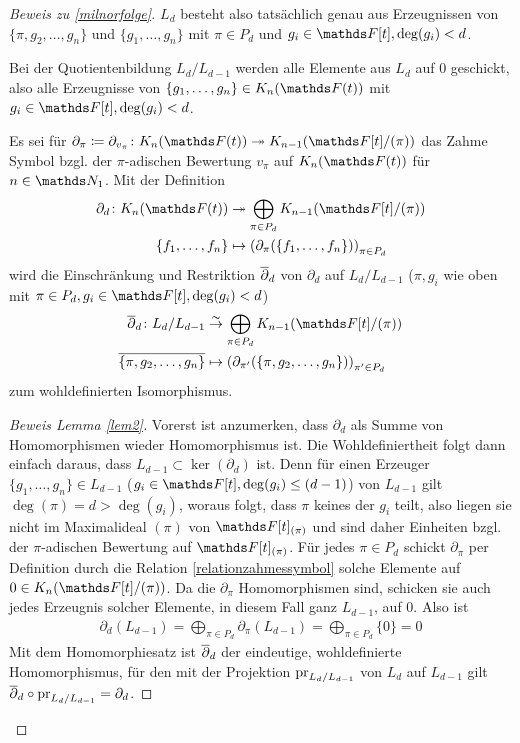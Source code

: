 \documentclass[ngerman,fontsize=11pt, paper=a4, parskip=half, titlepage=true, toc=bib]{scrartcl}
\begin{document}
\begin{proof}[Beweis zu \ref{milnorfolge}]
  $L_d$ besteht also tatsächlich genau aus Erzeugnissen von
  $\{\pi,g_2,\dotsc,g_n\}$ und $\{g_1,\dotsc,g_n\}$
  mit $\pi\in P_d$ und $g_i\in\F[t], \deg(g_i)<d$.

  Bei der Quotientenbildung $L_d/L_{d-1}$ werden alle Elemente aus
  $L_d$ auf $0$ geschickt, also alle Erzeugnisse von
  $\{g_1,\dotsc,g_n\}\in\KnFt$ mit $g_i\in\F[t], \deg(g_i)<d$.

  \begin{Lem}[\eqref{2}]\label{lem2}
    Es sei für $\partial_\pi\coloneqq \partial_{v_\pi}\colon
    \KnFt\twoheadrightarrow\K_{n-1}(\Ftpi)$
    das Zahme Symbol bzgl. der $\pi$-adischen Bewertung $v_\pi$ auf
    $\KnFt$ für $n\in\N_1$.
    Mit der Definition
    \begin{align*}
      \partial_d\colon \KnFt
      &\twoheadrightarrow \bigoplus_{\pi\in
        P_d}\K_{n-1}(\Ftpi)\\
      \{f_1,\dotsc,f_n\}
      &\mapsto\left(
        \partial_\pi(\{f_1,\dotsc,f_n\})
        \right)_{\pi\in P_d}
    \end{align*}
    wird die Einschränkung und Restriktion $\overline{\partial}_d$ 
    von $\partial_d$ auf $L_d/L_{d-1}$ 
    ($\pi,g_i$ wie oben mit $\pi\in P_d, g_i\in\F[t],\deg(g_i)<d$)
    \begin{align*}
      \ov{\partial}_d\colon L_d/L_{d-1}
      &\overset{\thicksim}{\rightarrow} \bigoplus_{\pi\in
        P_d}\K_{n-1}(\Ftpi)\\
      \ov{\{\pi,g_2,\dotsc,g_n\}}
      &\mapsto\left(
        \partial_{\pi'}(\{\pi,g_2,\dotsc,g_n\})
        \right)_{\pi'\in P_d}
    \end{align*}
    zum wohldefinierten Isomorphismus.
  \end{Lem}
  \begin{proof}[Beweis Lemma \ref{lem2}]
    Vorerst ist anzumerken, dass $\partial_d$ als Summe von
    Homomorphismen wieder Homomorphismus ist.
    Die Wohldefiniertheit folgt dann einfach daraus, dass $L_{d-1}\subset
    \ker(\partial_d)$ ist.
    Denn für einen Erzeuger
    $\{g_1,\dotsc,g_n\}\in L_{d-1}$ ($g_i\in\F[t],\deg(g_i)\leq (d-1)$)
    von $L_{d-1}$  gilt $\deg(\pi)=d>\deg(g_i)$, 
    woraus folgt, dass $\pi$ keines der $g_i$
    teilt, also liegen sie nicht im Maximalideal $(\pi)$ von
    $\F[t]_{(\pi)}$ und sind daher Einheiten bzgl. der $\pi$-adischen
    Bewertung auf $\F[t]_{(\pi)}$. Für jedes $\pi\in P_d$ schickt
    $\partial_\pi$ per Definition durch die Relation 
    \ref{relationzahmessymbol} solche Elemente auf $0\in\KnFtpi$.
    Da die $\partial_\pi$ Homomorphismen sind, schicken sie auch jedes
    Erzeugnis solcher Elemente, in diesem Fall ganz $L_{d-1}$, auf $0$.
    Also ist 
    \begin{gather*}
      \partial_d(L_{d-1})=\bigoplus_{\pi\in
        P_d}\partial_{\pi}(L_{d-1})=\bigoplus_{\pi\in P_d} \{0\}=0
    \end{gather*}
    Mit dem Homomorphiesatz ist $\overline\partial_d$ der eindeutige,
    wohldefinierte Homomorphismus, für den mit der Projektion
    $\operatorname{pr}_{L_d/L_{d-1}}$ von $L_d$ auf $L_{d-1}$ gilt
    $\overline\partial_d\circ \operatorname{pr}_{L_d/L_{d-1}}=\partial_d$.
    

\end{proof}
\end{proof}
\end{document}
